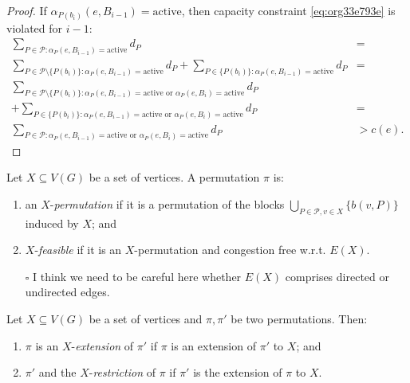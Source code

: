 \documentclass[fontsize=11pt,paper=a4]{book}
\begin{document}
\begin{proof}
If \(\alpha_{P(b_i)}(e,B_{i-1})=\mathrm{active}\), then capacity constraint \ref{eq:org33e793e} is violated for \(i-1\):
\begin{align*}
\sum_{P\in\mathcal{P}:\alpha_P(e,B_{i-1})=\mathrm{active}}d_P&=\\
\sum_{P\in\mathcal{P}\setminus\{P(b_i)\}:\alpha_P(e,B_{i-1})=\mathrm{active}}d_P+\sum_{P\in\{P(b_i)\}:\alpha_P(e,B_{i-1})=\mathrm{active}}d_P&=\\
\sum_{P\in\mathcal{P}\setminus\{P(b_i)\}:\alpha_P(e,B_{i-1})=\mathrm{active}\text{ or }\alpha_P(e,B_i)=\mathrm{active}}d_P&\\
+\sum_{P\in\{P(b_i)\}:\alpha_P(e,B_{i-1})=\mathrm{active}\text{ or }\alpha_P(e,B_i)=\mathrm{active}}d_P&=\\
\sum_{P\in\mathcal{P}:\alpha_P(e,B_{i-1})=\mathrm{active}\text{ or }\alpha_P(e,B_i)=\mathrm{active}}d_P&>
c(e).
\end{align*}
\end{proof}

\begin{defn}
Let \(X\subseteq V(G)\) be a set of vertices.
A permutation \(\pi\) is:

\begin{enumerate}
\item an \(X\)-\emph{permutation} if it is a permutation of the blocks \(\bigcup_{P\in\mathcal{P},v\in X}\{b(v,P)\}\) induced by \(X\); and

\item \(X\)-\emph{feasible} if it is an \(X\)-permutation and congestion free w.r.t. \(E(X)\).
\end{enumerate}
\end{defn}

\begin{itemize}
\item[{$\square$}] I think we need to be careful here whether \(E(X)\) comprises directed or undirected edges.
\end{itemize}

\begin{defn}
Let \(X\subseteq V(G)\) be a set of vertices and \(\pi,\pi'\) be two permutations.
Then:

\begin{enumerate}
\item \(\pi\) is an \(X\)-\emph{extension} of \(\pi'\) if \(\pi\) is an extension of \(\pi'\) to \(X\); and

\item \(\pi'\) and the \(X\)-\emph{restriction} of \(\pi\) if \(\pi'\) is the extension of \(\pi\) to \(X\).
\end{enumerate}
\end{defn}
\end{document}
